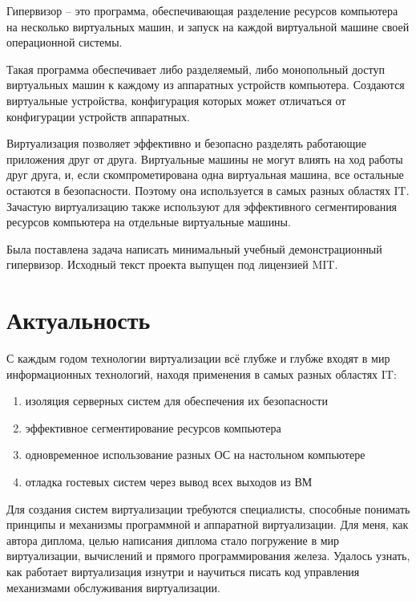 \documentclass[a4paper,12pt]{extarticle}
\begin{document}
	Гипервизор -- это программа, обеспечивающая разделение ресурсов компьютера на несколько виртуальных машин, и запуск на каждой виртуальной машине своей операционной системы. \par
	Такая программа обеспечивает либо разделяемый, либо монопольный доступ виртуальных машин к каждому из аппаратных устройств компьютера. Создаются виртуальные устройства, конфигурация которых может отличаться от конфигурации устройств аппаратных.\par
	Виртуализация позволяет эффективно и безопасно разделять работающие приложения друг от друга. Виртуальные машины не могут влиять на ход работы друг друга, и, если скомпрометирована одна виртуальная машина, все остальные остаются в безопасности. Поэтому она используется в самых разных областях IT. Зачастую виртуализацию также используют для эффективного сегментирования ресурсов компьютера на отдельные виртуальные машины.\par
	Была поставлена задача написать минимальный учебный демонстрационный гипервизор. Исходный текст проекта выпущен под лицензией MIT.
	\pagebreak
	\section{Актуальность}
	С каждым годом технологии виртуализации всё глубже и глубже входят в мир информационных технологий, находя применения в самых разных областях IT:
	\begin{enumerate}
		\item изоляция серверных систем для обеспечения их безопасности
		\item эффективное сегментирование ресурсов компьютера
		\item одновременное использование разных ОС на настольном компьютере
		\item отладка гостевых систем через вывод всех выходов из ВМ
	\end{enumerate}
	\par Для создания систем виртуализации требуются специалисты, способные понимать принципы и механизмы программной и аппаратной виртуализации. Для меня, как автора диплома, целью написания диплома стало погружение в мир виртуализации, вычислений и прямого программирования железа. Удалось узнать, как работает виртуализация изнутри и научиться писать код управления механизмами обслуживания виртуализации. \par
	\pagebreak	
\end{document}
